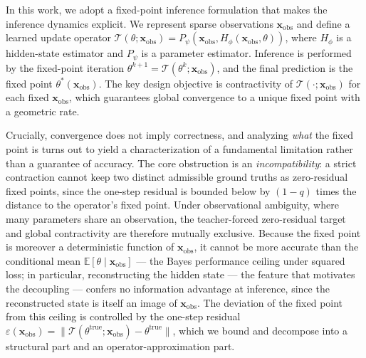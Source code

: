 In this work, we adopt a fixed-point inference formulation that makes the inference dynamics explicit.
We represent sparse observations $\mathbf{x}_{\mathrm{obs}}$  and define a learned update operator $ \mathcal{T}(\theta;\mathbf{x}_{\mathrm{obs}})=P_{\psi}\left(\mathbf{x}_{\mathrm{obs}},H_{\phi}(\mathbf{x}_{\mathrm{obs}},\theta)\right)$, where $H_{\phi}$ is a hidden-state estimator and $P_{\psi}$ is a parameter estimator. 
Inference is performed by the fixed-point iteration $\theta^{k+1}=\mathcal{T}(\theta^{k};\mathbf{x}_{\mathrm{obs}})$, and the final prediction is the fixed point $\theta^*(\mathbf{x}_{\mathrm{obs}})$. 
The key design objective is contractivity of $\mathcal{T}(\cdot;\mathbf{x}_{\mathrm{obs}})$ for each fixed $\mathbf{x}_{\mathrm{obs}}$, which guarantees global convergence to a unique fixed point with a geometric rate.

Crucially, convergence does not imply correctness, and analyzing \emph{what} the fixed point is turns out to yield a characterization of a fundamental limitation rather than a guarantee of accuracy. The core obstruction is an \emph{incompatibility}: a strict contraction cannot keep two distinct admissible ground truths as zero-residual fixed points, since the one-step residual is bounded below by $(1-q)$ times the distance to the operator's fixed point. Under observational ambiguity, where many parameters share an observation, the teacher-forced zero-residual target and global contractivity are therefore mutually exclusive. Because the fixed point is moreover a deterministic function of $\mathbf{x}_{\mathrm{obs}}$, it cannot be more accurate than the conditional mean $\mathbb{E}[\theta\mid\mathbf{x}_{\mathrm{obs}}]$ --- the Bayes performance ceiling under squared loss; in particular, reconstructing the hidden state --- the feature that motivates the decoupling --- confers no information advantage at inference, since the reconstructed state is itself an image of $\mathbf{x}_{\mathrm{obs}}$. The deviation of the fixed point from this ceiling is controlled by the one-step residual $\varepsilon(\mathbf{x}_{\mathrm{obs}})=\lVert \mathcal{T}(\theta^{\mathrm{true}};\mathbf{x}_{\mathrm{obs}})-\theta^{\mathrm{true}}\rVert$, which we bound and decompose into a structural part and an operator-approximation part.

